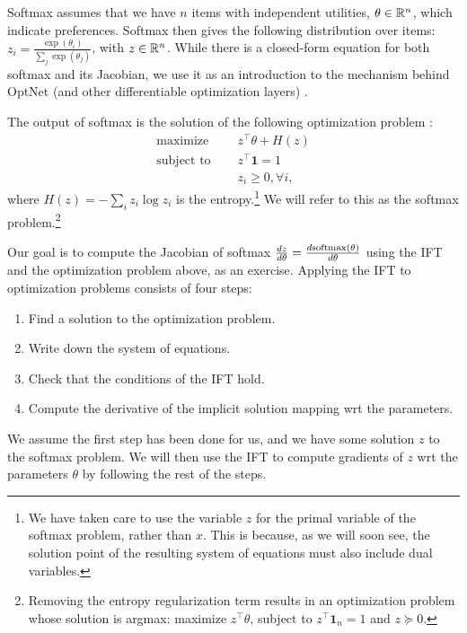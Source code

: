 \documentclass[11pt]{article}
\begin{document}
Softmax assumes that we have $n$ items with independent utilities, $\theta \in \mathbb{R}^n$,
which indicate preferences.
Softmax then gives the following distribution over items:
$z_i = \frac{\exp(\theta_i)}{\sum_j \exp(\theta_j)}$, with $z\in\mathbb{R}^n$.
While there is a closed-form equation
for both softmax and its Jacobian,
we use it as an introduction to the mechanism
behind OptNet (and other differentiable optimization layers)
\citep{optnet,agrawal2019diffcvx}.

The output of softmax is the solution of the following optimization problem \citep{gao2018properties}:
\begin{equation}
\label{eqn:softmax-opt}
\begin{aligned}
\textrm{maximize } \quad & z^\top\theta + H(z)\\
\textrm{subject to } \quad & z^\top \mathbf{1} = 1\\
& z_i \geq 0, \forall i,
\end{aligned}
\end{equation}
where $H(z) = -\sum_i z_i \log z_i$ is the entropy.\footnote{
We have taken care to use the variable $z$
for the primal variable of the softmax problem, rather than $x$.
This is because, as we will soon see, the solution point of the resulting system
of equations must also include dual variables.
}
We will refer to this as the softmax problem.\footnote{
Removing the entropy regularization term results in an optimization problem
whose solution is argmax: maximize $z^\top\theta$, subject to $z^\top\mathbf{1}_n=1$
and $z \succeq 0$.
}

Our goal is to compute the Jacobian of softmax
$\frac{dz}{d\theta} = \frac{d\mathrm{softmax}(\theta)}{d\theta}$
using the IFT and the optimization problem above, as an exercise.
Applying the IFT to optimization problems consists of four steps:
\begin{enumerate}
\item Find a solution to the optimization problem.
\item Write down the system of equations.
\item Check that the conditions of the IFT hold.
\item Compute the derivative of the implicit solution mapping wrt the parameters.
\end{enumerate}

We assume the first step has been done for us,
and we have some solution $z$ to the softmax problem.
We will then use the IFT to compute gradients of $z$ wrt the parameters $\theta$
by following the rest of the steps.
\end{document}
